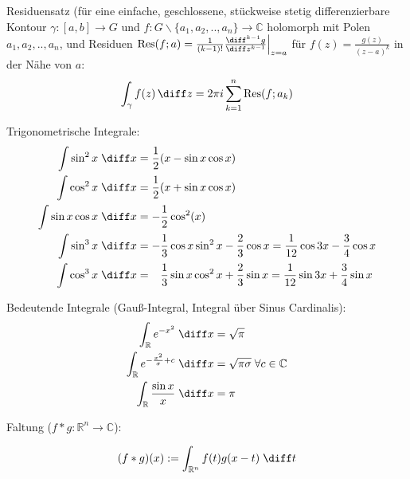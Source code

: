 \documentclass[11pt]{article}
\numberwithin{equation}{section}
\begin{document}
        Residuensatz (für eine einfache, geschlossene, stückweise stetig differenzierbare Kontour $\gamma:\left[a,b\right]\rightarrow G$ und $f:G\backslash\lbrace a_1, a_2, .., a_n\rbrace \rightarrow \mathbb{C}$ holomorph mit Polen $a_1, a_2, .., a_n$, und Residuen $\mathrm{Res}(f; a) = \frac{1}{(k-1)!}\frac{\diff^{k-1} g}{\diff z^{k-1}}\Big|_{z=a}$ für $f(z)=\frac{g(z)}{(z-a)^k}$ in der Nähe von $a$:
        \begin{equation}
          \int_\gamma f(z)\,\diff z = 2\pi i \sum_{k=1}^{n} \mathrm{Res}(f; a_k)
        \end{equation}

  			Trigonometrische Integrale:
  			\begin{equation}
  				\begin{split}
  					\int \sin^2 x\;\diff x &= \frac{1}{2}( x-\sin  x\cos  x) \\
  					\int \cos^2 x\;\diff x &= \frac{1}{2}( x+\sin  x\cos  x) \\
  					\int{\sin x\cos x\;\diff x} &= -\frac{1}{2}\cos^2( x) \\
  					\int \sin^3 x\;\diff x &= -\frac{1}{3}\cos{ x}\sin^2{ x}-\frac{2}{3}\cos{ x}
            = \frac{1}{12}\cos{3 x}-\frac{3}{4}\cos{ x} \\
  					\int \cos^3 x\;\diff x &= \phantom{-}\frac{1}{3}\sin x \cos^2 x+\frac{2}{3}\sin  x
            = \frac{1}{12}\sin{3 x}+\frac{3}{4}\sin{ x} \\
  				\end{split}
  			\end{equation}

        Bedeutende Integrale (Gauß-Integral, Integral über Sinus Cardinalis):
        \begin{equation}
          \begin{aligned}
            \int_\mathbb{R} e^{-x^2}\;\diff x &= \sqrt{\pi} \\
            \int_\mathbb{R} e^{-\frac{x^2}{\sigma}+c}\;\diff x &= \sqrt{\pi\sigma} \;\forall c\in\mathbb{C} \\
            \int_\mathbb{R} \frac{\sin x}{x}\;\diff x &= \pi \\
          \end{aligned}
        \end{equation}

        Faltung ($f*g:\mathbb{R}^n \rightarrow \mathbb{C}$):

        \begin{equation}
          (f*g)(x) := \int_{\mathbb{R}^n} f(t) g(x-t)\;\diff t
        \end{equation}
\end{document}
